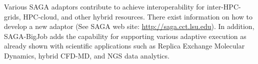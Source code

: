 \documentclass{sig-alternate}
\begin{document}
Various SAGA adaptors contribute to achieve interoperability for
inter-HPC-grids, HPC-cloud, and other hybrid resources.  There exist
information on how to develop a new adaptor (See SAGA web site:
\url{http://saga.cct.lsu.edu}). In addition, SAGA-BigJob adds the
capability for supporting various adaptive execution as already shown
with scientific applications such as Replica Exchange Molecular
Dynamics, hybrid CFD-MD, and NGS data
analytics\cite{saga-royalsoc,coupled,ecmls11}.

\end{document}
